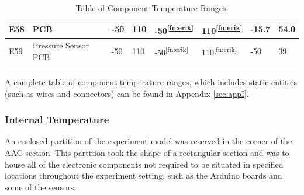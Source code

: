 \documentclass[a4paper,12pt,oneside]{article}
\providecommand{\DIFaddbegin}{} %
\providecommand{\DIFaddend}{} %
\providecommand{\DIFdelbegin}{} %
\providecommand{\DIFdelend}{} %
\newcommand{\DIFscaledelfig}{0.5}
\newlength{\DIFdelgraphicswidth} %
\newlength{\DIFdelgraphicsheight} %
\newcommand{\DIFaddincludegraphics}[2][]{{\color{blue}\fbox{\DIFOincludegraphics[#1]{#2}}}} %
\newcommand{\DIFdelincludegraphics}[2][]{%
\sbox{\DIFdelgraphicsbox}{\DIFOincludegraphics[#1]{#2}}%
\settoboxwidth{\DIFdelgraphicswidth}{\DIFdelgraphicsbox} %
\settoboxtotalheight{\DIFdelgraphicsheight}{\DIFdelgraphicsbox} %
\scalebox{\DIFscaledelfig}{%
\parbox[b]{\DIFdelgraphicswidth}{\usebox{\DIFdelgraphicsbox}\\[-\baselineskip] \rule{\DIFdelgraphicswidth}{0em}}\llap{\resizebox{\DIFdelgraphicswidth}{\DIFdelgraphicsheight}{%
\setlength{\unitlength}{\DIFdelgraphicswidth}%
\begin{picture}(1,1)%
\thicklines\linethickness{2pt} %
{\color[rgb]{1,0,0}\put(0,0){\framebox(1,1){}}}%
{\color[rgb]{1,0,0}\put(0,0){\line( 1,1){1}}}%
{\color[rgb]{1,0,0}\put(0,1){\line(1,-1){1}}}%
\end{picture}%
}\hspace*{3pt}}} %
} %
\DeclareRobustCommand{\DIFaddbegin}{\DIFOaddbegin \let\includegraphics\DIFaddincludegraphics} %
\DeclareRobustCommand{\DIFaddend}{\DIFOaddend \let\includegraphics\DIFOincludegraphics} %
\DeclareRobustCommand{\DIFdelbegin}{\DIFOdelbegin \let\includegraphics\DIFdelincludegraphics} %
\DeclareRobustCommand{\DIFdelend}{\DIFOaddend \let\includegraphics\DIFOincludegraphics} %
\begin{document}
\begin{longtable}{|m{1cm}|m{3.5cm}|m{1.3cm}|m{1.3cm}|m{1.4cm}|m{1.3cm}|m{1.3cm}|m{1.3cm}|}
E58 & PCB & -50 & 110 & -50\textsuperscript{\ref{fn:erik}} & 110\textsuperscript{\ref{fn:erik}} & -15.7 & 54.0 \\ \hline
E59 & Pressure Sensor PCB & -50 & 110 & -50\textsuperscript{\ref{fn:erik}} & 110\textsuperscript{\ref{fn:erik}} & -50 & 39 \\ \hline


\caption{Table of Component Temperature Ranges.}
\DIFdelbegin %
\DIFdelend \DIFaddbegin \label{tab:thermal-table-4}
\DIFaddend \end{longtable}
\raggedbottom










\raggedbottom

A complete table of component temperature ranges, which includes static entities (such as wires and connectors) can be found in Appendix \ref{sec:appI}.

\subsubsection{Internal Temperature}
An enclosed partition of the experiment model was reserved in the corner of the AAC section. This partition took the shape of a rectangular section and was to house all of the electronic components not required to be situated in specified locations throughout the experiment setting, such as the Arduino boards and some of the sensors.
\end{document}
